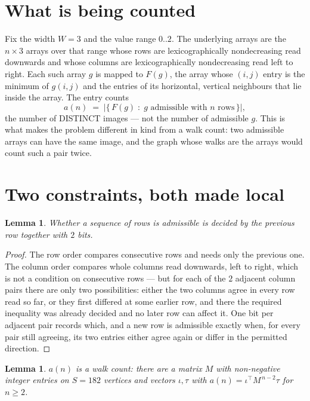 \documentclass[11pt,a4paper]{article}
\theoremstyle{plain}
\newtheorem{lemma}[theorem]{Lemma}
\theoremstyle{definition}
\begin{document}
\section{What is being counted}

Fix the width $W=3$ and the value range $0..2$. The underlying arrays are the
$n\times3$ arrays over that range whose rows are lexicographically nondecreasing read downwards
and whose columns are lexicographically nondecreasing read left to right. Each such array $g$
is mapped to $F(g)$, the array whose $(i,j)$ entry is the minimum of $g(i,j)$ and the entries
of its horizontal, vertical neighbours that lie inside the array. The entry counts
\[
a(n)\;=\;\bigl|\{\,F(g)\;:\;g\text{ admissible with }n\text{ rows}\,\}\bigr|,
\]
the number of DISTINCT images --- not the number of admissible $g$. This is what makes the
problem different in kind from a walk count: two admissible arrays can have the same image, and
the graph whose walks are the arrays would count such a pair twice.

\section{Two constraints, both made local}

\begin{lemma}\label{lem:local}
Whether a sequence of rows is admissible is decided by the previous row together with
$2$ bits.
\end{lemma}

\begin{proof}
The row order compares consecutive rows and needs only the previous one. The column order
compares whole columns read downwards, left to right, which is not a condition on consecutive
rows --- but for each of the $2$ adjacent column pairs there are only two possibilities:
either the two columns agree in every row read so far, or they first differed at some earlier
row, and there the required inequality was already decided and no later row can affect it. One
bit per adjacent pair records which, and a new row is admissible exactly when, for every pair
still agreeing, its two entries either agree again or differ in the permitted direction.
\end{proof}

\begin{lemma}\label{lem:det}
$a(n)$ is a walk count: there are a matrix $M$ with non-negative integer entries on $S=182$
vertices and vectors $\iota,\tau$ with $a(n)=\iota^{\!\top}M^{\,n-2}\tau$ for $n\ge2$.
\end{lemma}
\end{document}
